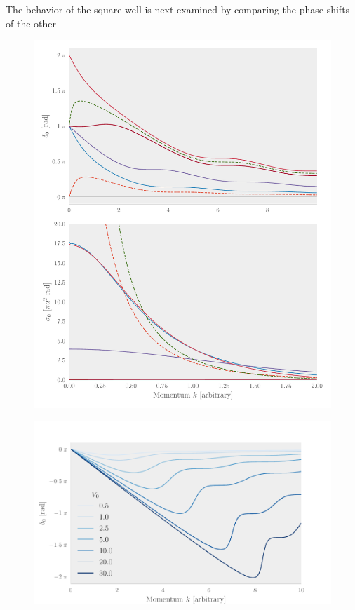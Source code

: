 The behavior of the square well is next examined by comparing the phase shifts
of the other 

\begin{figure}[p]
  \centering
  \includegraphics[]{Figures/square_well_wave.pdf}
  \caption{\label{fig:squarewell} }
\end{figure}

\begin{figure}[ht]
  \centering
  \includegraphics[]{Figures/positive_square_well.pdf}
  \caption{\label{fig:positivesquare} }
\end{figure}


